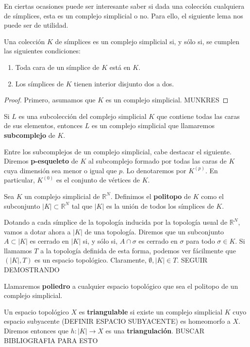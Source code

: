 En ciertas ocasiones puede ser interesante saber si dada una colección cualquiera de símplices, esta es 
un complejo simplicial o no. Para ello, el siguiente lema nos puede ser de utilidad.

\begin{lema}
	Una colección $K$ de símplices es un complejo simplicial si, y sólo si, se cumplen las siguientes 
	condiciones:
	\begin{enumerate}
		\item Toda cara de un símplice de $K$ está en $K$.
		\item Los símplices de $K$ tienen interior disjunto dos a dos.
	\end{enumerate}
\end{lema}
\begin{proof}
	Primero, asumamos que $K$ es un complejo simplicial. MUNKRES
\end{proof}

\begin{definicion}
	Si $L$ es una subcolección del complejo simplicial $K$ que contiene todas las caras de sus 
	elementos, entonces $L$ es un complejo simplicial que llamaremos \textbf{subcomplejo} de $K$.
\end{definicion}
Entre los subcomplejos de un complejo simplicial, cabe destacar el siguiente. Diremos \textbf{p-esqueleto} 
de $K$ al subcomplejo formado por todas las caras de $K$ cuya dimensión sea menor o igual que $p$. Lo denotaremos por $K^{(p)}$. En particular, $K^{(0)}$ es el conjunto de vértices de $K$.

\begin{definicion}
	Sea $K$ un complejo simplicial de $\mathbb{R}^N$. Definimos el \textbf{politopo} de $K$ como el 
	subconjunto $|K| \subset \mathbb{R}^N$ tal que $|K|$ es la unión de todos los símplices de $K$.
\end{definicion}
Dotando a cada símplice de la topología inducida por la topología usual de $\mathbb{R}^N$, vamos a dotar ahora a $|K|$ de una topología. Diremos que un subconjunto $A \subset |K|$ es cerrado en $|K|$ si, y sólo si, $A \cap \sigma$ es cerrado en $\sigma$ para todo $\sigma \in K$. Si llamamos $T$ a la topología 
definida de esta forma, podemos ver fácilmente que $(|K|, T)$ es un espacio topológico. Claramente, $\emptyset, |K| \in T$. SEGUIR DEMOSTRANDO

Llamaremos \textbf{poliedro} a cualquier espacio topológico que sea el politopo de un complejo simplicial.

\begin{definicion}
	Un espacio topológico $X$ es \textbf{triangulable} si existe un complejo simplicial $K$ cuyo espacio subyacente (DEFINIR ESPACIO SUBYACENTE) es homeomorfo a $X$. Diremos entonces que $h: |K| \rightarrow X$ es una \textbf{triangulación}. BUSCAR BIBLIOGRAFIA PARA ESTO
\end{definicion}

